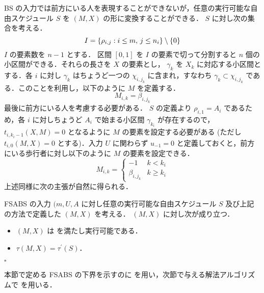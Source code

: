 BS の入力では前方にいる人を表現することができないが，任意の実行可能な自由スケジュール $S$ を $(M, X)$ の形に変換することができる． $S$ に対し次の集合を考える．
\begin{equation}
  I = \{ \rho_{i, j} : i \leq m,\, j\leq n_i \} \setminus \{ 0 \}
\end{equation}
$I$ の要素数を $n - 1$ とする． 区間 $[0, 1]$ を $I$ の要素で切って分割すると $n$ 個の小区間ができる．それらの長さを $X$ の要素とし， $\gamma_k$ を $X_k$ に対応する小区間とする．各 $i$ に対し $\gamma_k$ はちょうど一つの $\chi_{i,j_k}$ に含まれ，すなわち $\gamma_k \subset \chi_{i,j_k}$ である．このことを利用し，以下のように $M$ を定義する．
\begin{equation}
  M_{i,k} = \beta_{i,j_k}
\end{equation}
最後に前方にいる人を考慮する必要がある． $S$ の定義より $\rho_{i,1} = A_i$ であるため，各 $i$ に対しちょうど $A_i$ で始まる小区間 $\gamma_{k_i}$ が存在するので， $t_{i,k_i - 1}(X, M) = 0$ となるように $M$ の要素を設定する必要がある (ただし $t_{i,0}(M, X) = 0$ とする)．入力 $U$ に関わらず $u_{-1} = 0$ と定義しておくと，前方にいる歩行者に対し以下のように $M$ の要素を設定できる．
\begin{equation}
  M_{i,k} = \begin{cases}
    -1 & k < k_i \\
    \beta_{i,j_k} & k \geq k_i
  \end{cases}
\end{equation}
上述同様に次の主張が自然に得られる．
\begin{claim}\label{claim:fsabs-to-bs}
  FSABS の入力 $(m, U, A$ に対し任意の実行可能な自由スケジュール $S$ 及び上記の方法で定義した $(M, X)$ を考える． $(M, X)$ に対し次が成り立つ．
  \begin{itemize}
  \item $(M, X)$ は  を満たし実行可能である．
  \item $\tau(M, X) = \tau^\prime(S)$．
  \end{itemize}
  \hfill $\square$
\end{claim}
本節で定める FSABS の下界を示すのに を用い，次節で与える解法アルゴリズムで を用いる．


